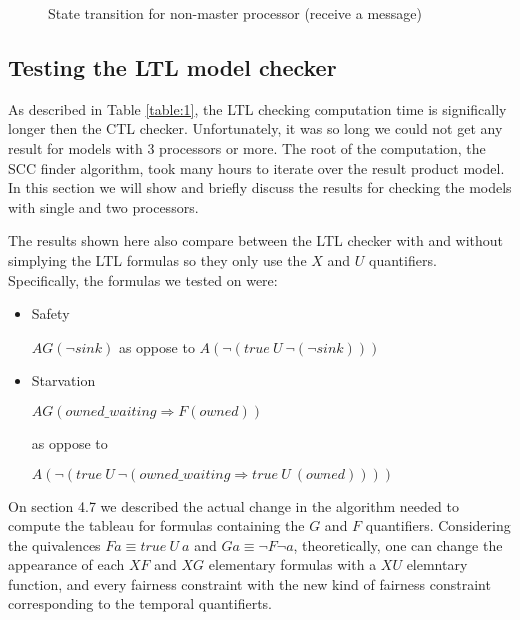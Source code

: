 \documentclass[11pt]{article}
\begin{document}
\begin{figure}
        \caption{State transition for non-master processor (receive a message)} \label{fig:3}
        \end{figure}

    \subsection{Testing the LTL model checker}
        As described in Table \ref{table:1}, the LTL checking computation time is significally longer then the CTL checker. Unfortunately, it
        was so long we could not get any result for models with 3 processors or more. The root of the computation, the SCC finder algorithm,
        took many hours to iterate over the result product model. In this section we will show and briefly discuss the results
        for checking the models with single and two processors.

        The results shown here also compare between the LTL checker with and without simplying the LTL formulas so they only use the $X$ and $U$
        quantifiers. Specifically, the formulas we tested on were:

        \begin{itemize}
            \item Safety
            
            $AG(\lnot sink)$ as oppose to $A(\lnot (true\ U\ \lnot(\lnot sink)))$

            \item Starvation 
            
            $AG(owned\_waiting \Rightarrow F(owned))$ 
            
            as oppose to 
            
            $A(\lnot (true\ U\ \lnot(owned\_waiting \Rightarrow true\ U\ (owned))))$
        \end{itemize}

        On section 4.7 we described the actual change in the algorithm needed to compute the tableau for formulas containing the $G$ and $F$
        quantifiers. Considering the quivalences $Fa \equiv true\ U\ a$ and $Ga \equiv \lnot F \lnot a$, theoretically, one can change the appearance
        of each $XF$ and $XG$ elementary formulas with a $XU$ elemntary function, and every fairness constraint with the new kind of fairness constraint
        corresponding to the temporal quantifierts.
\end{document}

